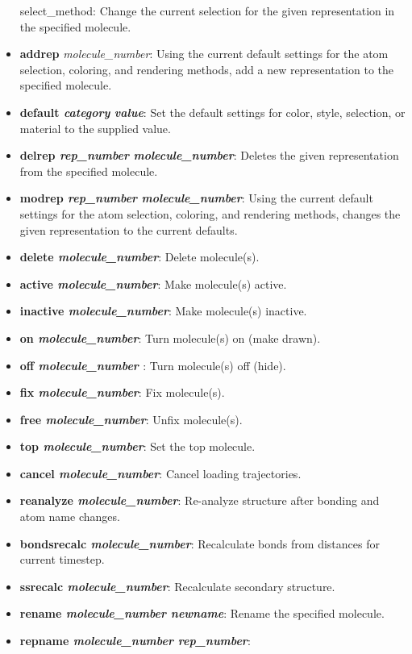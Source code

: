 \begin{itemize}
{{select\_method}}: Change the current selection for the given representation
in the specified molecule.
    \item {{\bf  addrep} {\it molecule\_number}}: Using the current default 
           settings for the atom selection, coloring, and rendering methods, 
           add a new representation to the specified molecule.
    \item {\bf  default {\it category} {\it value}}: Set the default settings for color, style, selection, or material to the supplied value.
    \item {\bf  delrep {\it rep\_number} {\it molecule\_number}}: Deletes the
given representation from the specified molecule.
    \item {\bf  modrep {\it rep\_number} {\it molecule\_number}}: Using the 
    current default settings for the atom selection, coloring, 
    and rendering methods, changes the given representation to the 
    current defaults.
    \item {\bf  delete  {\it molecule\_number}}: Delete molecule(s).
    \item {\bf  active {\it molecule\_number}}: Make molecule(s) active.
    \item {\bf  inactive {\it  molecule\_number}}: Make molecule(s) inactive.
    \item {\bf  on {\it molecule\_number}}: Turn molecule(s) on (make drawn).
    \item {\bf  off {\it  molecule\_number }}: Turn molecule(s) off (hide).
    \item {\bf  fix {\it  molecule\_number}}: Fix molecule(s).
    \item {\bf  free {\it  molecule\_number}}: Unfix molecule(s).
    \item {\bf  top {\it molecule\_number}}: Set the top molecule.
    \item {\bf  cancel {\it molecule\_number}}: Cancel loading trajectories.
    \item {\bf  reanalyze {\it molecule\_number}}: Re-analyze structure after bonding and atom name changes.
    \item {\bf  bondsrecalc {\it molecule\_number}}: Recalculate bonds from distances for current timestep.
    \item {\bf  ssrecalc {\it molecule\_number}}: Recalculate secondary structure.
    \item {\bf  rename {\it molecule\_number newname}}: Rename the specified 
molecule.
    \item {\bf  repname {\it molecule\_number rep\_number}}:

\end{itemize}
